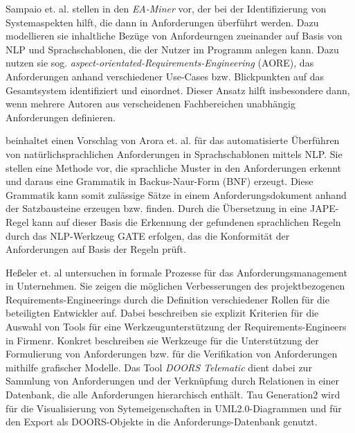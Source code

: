 \documentclass[12pt]{report}
\begin{document}
\vspace{12pt}

Sampaio et. al. stellen in \cite{AS05} den \textit{EA-Miner} vor, der bei der Identifizierung von Systemaspekten hilft, die dann in Anforderungen überführt werden. Dazu modellieren sie inhaltliche Bezüge von Anfordeurngen zueinander auf Basis von NLP und Sprachschablonen, die der Nutzer im Programm anlegen kann. Dazu nutzen sie sog. \textit{aspect-orientated-Requirements-Engineering} (AORE), das Anforderungen anhand verschiedener Use-Cases bzw. Blickpunkten auf das Gesamtsystem identifiziert und einordnet. Dieser Ansatz hilft insbesondere dann, wenn mehrere Autoren aus verscheidenen Fachbereichen unabhängig Anforderungen definieren.

\vspace{12pt}

\cite{ca15} beinhaltet einen Vorschlag von Arora et. al. für das automatisierte Überführen von natürlichsprachlichen Anforderungen in Sprachschablonen mittels NLP. Sie stellen eine Methode vor, die sprachliche Muster in den Anforderungen erkennt und daraus eine Grammatik in Backus-Naur-Form (BNF) erzeugt. Diese Grammatik kann somit zulässige Sätze in einem Anforderungsdokument anhand der Satzbausteine erzeugen bzw. finden. Durch die Übersetzung in eine JAPE-Regel kann auf dieser Basis die Erkennung der gefundenen sprachlichen Regeln durch das NLP-Werkzeug GATE erfolgen, das die Konformität der Anforderungen auf Basis der Regeln prüft. 

\vspace{12pt}

Heßeler et. al untersuchen in \cite{he13} formale Prozesse für das Anforderungsmanagement in Unternehmen. Sie zeigen die möglichen Verbesserungen  des projektbezogenen Requirements-Engineerings durch die Definition verschiedener Rollen für die beteiligten Entwickler auf. Dabei beschreiben sie explizit Kriterien für die Auswahl von Tools für eine Werkzeugunterstützung der Requirements-Engineers in Firmenr. Konkret beschreiben sie Werkzeuge für die Unterstützung der Formulierung von Anforderungen bzw. für die Verifikation von Anforderungen mithilfe grafischer Modelle. Das Tool \textit{DOORS Telematic} dient dabei zur Sammlung von Anforderungen und der Verknüpfung durch Relationen in einer Datenbank, die alle Anforderungen hierarchisch enthält. Tau Generation2 wird für die Visualisierung von Sytemeigenschaften in UML2.0-Diagrammen und für den Export als DOORS-Objekte in die Anforderungs-Datenbank genutzt.
\end{document}
